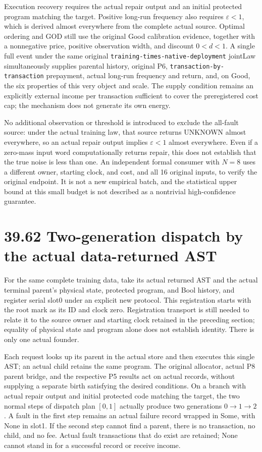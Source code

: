 \documentclass[
  english,
  11pt,
  oneside]{book}
\begin{document}
Execution recovery requires the actual repair output and an initial protected program matching the target. Positive long-run frequency also requires \(\varepsilon<1\), which is derived almost everywhere from the complete actual source. Optimal ordering and GOD still use the original Good calibration evidence, together with a nonnegative price, positive observation width, and discount \(0<d<1\). A single full event under the same original \nolinkurl{training-times-native-deployment} jointLaw simultaneously supplies parental history, original P6, \nolinkurl{transaction-by-transaction} prepayment, actual long-run frequency and return, and, on Good, the six properties of this very object and scale. The supply condition remains an explicitly external income per transaction sufficient to cover the preregistered cost cap; the mechanism does not generate its own energy.

No additional observation or threshold is introduced to exclude the all-fault source: under the actual training law, that source returns UNKNOWN almost everywhere, so an actual repair output implies \(\varepsilon<1\) almost everywhere. Even if a zero-mass input word computationally returns repair, this does not establish that the true noise is less than one. An independent formal consumer with \(N=8\) uses a different owner, starting clock, and cost, and all 16 original inputs, to verify the original endpoint. It is not a new empirical batch, and the statistical upper bound at this small budget is not described as a nontrivial high-confidence guarantee.

\section{39.62 Two-generation dispatch by the actual data-returned AST}\label{two-generation-dispatch-by-the-actual-data-returned-ast}

For the same complete training data, take its actual returned AST and the actual terminal parent's physical state, protected program, and Bool history, and register serial slot0 under an explicit new protocol. This registration starts with the root mark as its ID and clock zero. Registration transport is still needed to relate it to the source owner and starting clock retained in the preceding section; equality of physical state and program alone does not establish identity. There is only one actual founder.

Each request looks up its parent in the actual store and then executes this single AST; an actual child retains the same program. The original allocator, actual P8 parent bridge, and the respective P5 results act on actual records, without supplying a separate birth satisfying the desired conditions. On a branch with actual repair output and initial protected code matching the target, the two normal steps of dispatch plan \([0,1]\) actually produce two generations \(0\to1\to2\). A fault in the first step remains an actual failure record wrapped in Some, with None in slot1. If the second step cannot find a parent, there is no transaction, no child, and no fee. Actual fault transactions that do exist are retained; None cannot stand in for a successful record or receive income.
\end{document}
